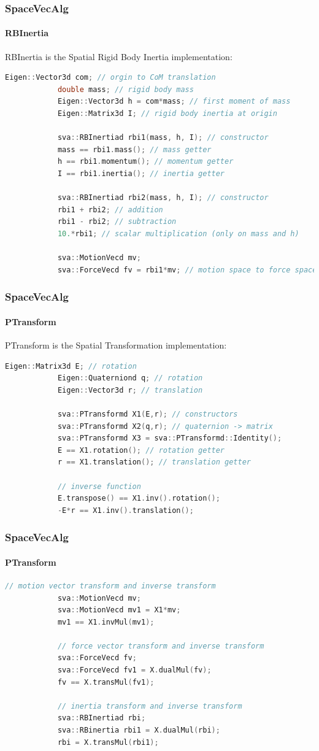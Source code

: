 \documentclass{beamer}
\begin{document}
  	\begin{frame}[fragile]
		\frametitle{SpaceVecAlg}
		\framesubtitle{RBInertia}
		RBInertia is the Spatial Rigid Body Inertia implementation:
		\begin{lstlisting}[language=C++]
			Eigen::Vector3d com; // orgin to CoM translation
			double mass; // rigid body mass
			Eigen::Vector3d h = com*mass; // first moment of mass
			Eigen::Matrix3d I; // rigid body inertia at origin

			sva::RBInertiad rbi1(mass, h, I); // constructor
			mass == rbi1.mass(); // mass getter
			h == rbi1.momentum(); // momentum getter
			I == rbi1.inertia(); // inertia getter

			sva::RBInertiad rbi2(mass, h, I); // constructor
			rbi1 + rbi2; // addition
			rbi1 - rbi2; // subtraction
			10.*rbi1; // scalar multiplication (only on mass and h)

			sva::MotionVecd mv;
			sva::ForceVecd fv = rbi1*mv; // motion space to force space
		\end{lstlisting}
	\end{frame}


  	\begin{frame}[fragile]
		\frametitle{SpaceVecAlg}
		\framesubtitle{PTransform}
		PTransform is the Spatial Transformation implementation:
		\begin{lstlisting}[language=C++]
			Eigen::Matrix3d E; // rotation
			Eigen::Quaterniond q; // rotation
			Eigen::Vector3d r; // translation

			sva::PTransformd X1(E,r); // constructors
			sva::PTransformd X2(q,r); // quaternion -> matrix
			sva::PTransformd X3 = sva::PTransformd::Identity();
			E == X1.rotation(); // rotation getter
			r == X1.translation(); // translation getter

			// inverse function
			E.transpose() == X1.inv().rotation();
			-E*r == X1.inv().translation();
		\end{lstlisting}
	\end{frame}
  	\begin{frame}[fragile]
		\frametitle{SpaceVecAlg}
		\framesubtitle{PTransform}
		\begin{lstlisting}[language=C++]
			// motion vector transform and inverse transform
			sva::MotionVecd mv;
			sva::MotionVecd mv1 = X1*mv;
			mv1 == X1.invMul(mv1);

			// force vector transform and inverse transform
			sva::ForceVecd fv;
			sva::ForceVecd fv1 = X.dualMul(fv);
			fv == X.transMul(fv1);

			// inertia transform and inverse transform
			sva::RBInertiad rbi;
			sva::RBinertia rbi1 = X.dualMul(rbi);
			rbi = X.transMul(rbi1);
		\end{lstlisting}
	\end{frame}
\end{document}
